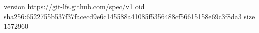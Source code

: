 version https://git-lfs.github.com/spec/v1
oid sha256:6522755b537f37facecd9e6c145588a41085f5356488cf56615158e69c3f8da3
size 1572960

